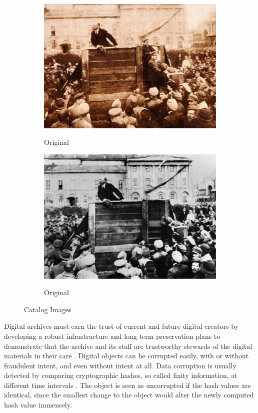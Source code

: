 \begin{figure}[h]%
    \centering
    \begin{subfigure}{6cm}
    \includegraphics[width=\linewidth]{graphics/trotzki1.jpg}\label{fig:f1}
    \caption{Original}
    \end{subfigure}
    \qquad
    \begin{subfigure}{6cm}\label{fig:f2}
    \includegraphics[width=\linewidth]{graphics/trotzki2.jpg}\label{fig:f1}
    \caption{Original}
    \end{subfigure}
    \caption{Catalog Images}%
    \label{fig:figure1}%
\end{figure}

Digital archives must earn the trust of current and future digital creators by developing a robust infrastructure and long-term preservation plans to demonstrate that the archive and its staff are trustworthy stewards of the digital materials in their care \cite[37]{kirschenbaum2010digital}. Digital objects can be corrupted easily, with or without fraudulent intent, and even without intent at all. Data corruption is usually detected by comparing cryptographic hashes, so called fixity information, at different time intervals \cite[1]{de2014checking}. The object is seen as uncorrupted if the hash values are identical, since the smallest change to the object would alter the newly computed hash value immensely. 

